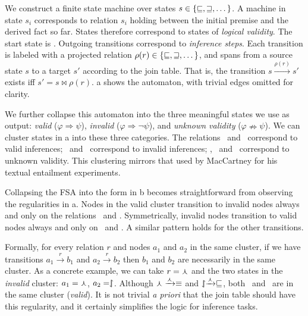 We construct a
  finite state machine over states
  $s \in \{\textrm{\small{\ensuremath{\sqsubseteq}}}, \textrm{\small{\ensuremath{\sqsupseteq}}}, \dots \}$.
A machine in state $s_i$ corresponds to relation $s_i$
  holding between the initial premise and the derived fact so far.
States therefore correspond to states of \textit{logical validity}.
The start state is \equivalent.
Outgoing transitions correspond to \textit{inference steps}.
Each transition is labeled with a projected relation
  $\rho(r) \in \{\textrm{\small{\ensuremath{\sqsubseteq}}}, \textrm{\small{\ensuremath{\sqsupseteq}}}, \dots\}$,
  and spans from a source
  state $s$ to a target $s'$ according to the join table.
That is, the transition $s \xrightarrow{\rho(r)} s'$ exists iff
  $s' = s \bowtie \rho(r)$.
a shows the automaton, with trivial edges
  omitted for clarity.



We further collapse this automaton into the three
  meaningful states we use as output: 
    \textit{valid} ($\varphi \Rightarrow \psi$),
    \textit{invalid} ($\varphi \Rightarrow \lnot \psi$),
  and \textit{unknown validity} ($\varphi \nRightarrow \psi$).
We can cluster states in a into these three categories.
The relations \equivalent\ and \forward\ correspond to valid inferences;
  \negate\ and \alternate\ correspond to invalid inferences;
  \reverse, \cover\ and \independent\ correspond to unknown validity.
This clustering mirrors that used by MacCartney for his textual
  entailment experiments.

Collapsing the FSA into the form in b becomes straightforward
  from observing the regularities in a.
Nodes in the valid cluster transition to invalid nodes
  always and only on the relations \negate\ and \alternate.
Symmetrically, invalid nodes transition to valid nodes always and only
  on \negate\ and \cover.
A similar pattern holds for the other transitions.

Formally, for every relation $r$ and nodes $a_1$ and $a_2$ in
  the same cluster, if we have transitions 
  $a_1 \xrightarrow{r} b_1$ and $a_2 \xrightarrow{r} b_2$
  then $b_1$ and $b_2$ are necessarily in the same cluster.
As a concrete example, we can take $r = \curlywedge$ and
  the two states in the \textit{invalid} cluster:
  $a_1 = \curlywedge$, $a_2 = \downharpoonleft\hspace{-1.25mm}\upharpoonright$.
Although $\curlywedge \xrightarrow{\curlywedge} \equiv$ and
  $\downharpoonleft\hspace{-1.25mm}\upharpoonright \xrightarrow{\curlywedge} \sqsubseteq$, both
  \equivalent\ and \forward\ are in the same cluster (\textit{valid}).
It is not trivial \textit{a priori} that the join table should have
  this regularity, and it certainly simplifies the logic for
  inference tasks.

